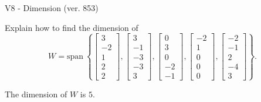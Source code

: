 \begin{exercise}
  \begin{exerciseTitle}V8 - Dimension (ver. 853)\end{exerciseTitle}
  \begin{exerciseStatement}
    Explain how to find the dimension of 
\[W=\mathrm{span}\ \left\{\left[\begin{array}{r}
3 \\
-2 \\
1 \\
2 \\
2
\end{array}\right] , \left[\begin{array}{r}
3 \\
-1 \\
-3 \\
-3 \\
3
\end{array}\right] , \left[\begin{array}{r}
0 \\
3 \\
0 \\
-2 \\
-1
\end{array}\right] , \left[\begin{array}{r}
-2 \\
1 \\
0 \\
0 \\
0
\end{array}\right] , \left[\begin{array}{r}
-2 \\
-1 \\
2 \\
-4 \\
3
\end{array}\right]\right\}.\]



  \end{exerciseStatement}
  \begin{exerciseAnswer}
   The dimension of \(W\) is  \(5\).
  


  \end{exerciseAnswer}
\end{exercise}
